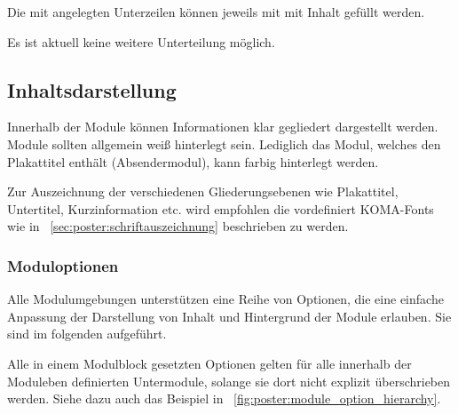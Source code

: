 Die mit  angelegten Unterzeilen können jeweils mit 
 mit Inhalt gefüllt werden.

Es ist aktuell keine weitere Unterteilung möglich.

\subsection{Inhaltsdarstellung}

Innerhalb der Module können Informationen klar gegliedert dargestellt werden.
Module sollten allgemein weiß hinterlegt sein. Lediglich das Modul, welches
den Plakattitel enthält (Absendermodul), kann farbig hinterlegt werden.

Zur Auszeichnung der verschiedenen Gliederungsebenen wie Plakattitel, 
Untertitel, Kurzinformation etc. wird empfohlen die vordefiniert KOMA-Fonts
wie in \chaptername~\ref{sec:poster:schriftauszeichnung} beschrieben
zu werden.

\subsubsection{Moduloptionen}

Alle Modulumgebungen unterstützen eine Reihe von Optionen, die eine
einfache Anpassung der Darstellung von Inhalt und Hintergrund der Module
erlauben.
Sie sind im folgenden aufgeführt.

\begin{hint}
  Alle in einem Modulblock gesetzten Optionen gelten für alle innerhalb
  der Moduleben definierten Untermodule, solange sie dort nicht explizit
  überschrieben werden. Siehe dazu auch das Beispiel in
  \figurename~\ref{fig:poster:module_option_hierarchy}.
\end{hint}


